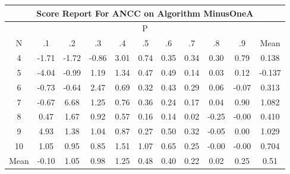 \documentclass[11pt,a4paper]{report}
\begin{document}
\begin{longtable}{ | c || c | c | c | c | c | c | c | c | c || c |}
\hline
\multicolumn{11}{|c|}{ Score Report For ANCC on Algorithm MinusOneA} \\
\hline
\multicolumn{11}{|c|}{ P } \\
\hline
N & .1 & .2 & .3 & .4 & .5 & .6 & .7 & .8 & .9 & Mean\\
 \hline
 \hline
 \endhead
  4 &  \cellcolor[HTML]{FFD7D7} -1.71 &  \cellcolor[HTML]{FFD7D7} -1.72 &  \cellcolor[HTML]{FFE7E7} -0.86 &  \cellcolor[HTML]{B7B7FF} 3.01 &  \cellcolor[HTML]{EFEFFF} 0.74 &  \cellcolor[HTML]{F7F7FF} 0.35 &  \cellcolor[HTML]{F7F7FF} 0.34 &  \cellcolor[HTML]{F7F7FF} 0.30 &  \cellcolor[HTML]{EFEFFF} 0.79 & 0.138 \\
  5 &  \cellcolor[HTML]{FF9797} -4.04 &  \cellcolor[HTML]{FFE7E7} -0.99 &  \cellcolor[HTML]{DFDFFF} 1.19 &  \cellcolor[HTML]{DFDFFF} 1.34 &  \cellcolor[HTML]{F7F7FF} 0.47 &  \cellcolor[HTML]{EFEFFF} 0.49 &  \cellcolor[HTML]{FFFFFF} 0.14 &  \cellcolor[HTML]{FFFFFF} 0.03 &  \cellcolor[HTML]{FFFFFF} 0.12 & -0.137 \\
  6 &  \cellcolor[HTML]{FFEFEF} -0.73 &  \cellcolor[HTML]{FFEFEF} -0.64 &  \cellcolor[HTML]{BFBFFF} 2.47 &  \cellcolor[HTML]{EFEFFF} 0.69 &  \cellcolor[HTML]{F7F7FF} 0.32 &  \cellcolor[HTML]{F7F7FF} 0.43 &  \cellcolor[HTML]{F7F7FF} 0.29 &  \cellcolor[HTML]{FFFFFF} 0.06 &  \cellcolor[HTML]{FFFFFF} -0.07 & 0.313 \\
  7 &  \cellcolor[HTML]{FFEFEF} -0.67 &  \cellcolor[HTML]{5858FF} 6.68 &  \cellcolor[HTML]{DFDFFF} 1.25 &  \cellcolor[HTML]{EFEFFF} 0.76 &  \cellcolor[HTML]{F7F7FF} 0.36 &  \cellcolor[HTML]{F7F7FF} 0.24 &  \cellcolor[HTML]{F7F7FF} 0.17 &  \cellcolor[HTML]{FFFFFF} 0.04 &  \cellcolor[HTML]{E7E7FF} 0.90 & 1.082 \\
  8 &  \cellcolor[HTML]{F7F7FF} 0.47 &  \cellcolor[HTML]{D7D7FF} 1.67 &  \cellcolor[HTML]{E7E7FF} 0.92 &  \cellcolor[HTML]{EFEFFF} 0.57 &  \cellcolor[HTML]{F7F7FF} 0.16 &  \cellcolor[HTML]{FFFFFF} 0.14 &  \cellcolor[HTML]{FFFFFF} 0.02 &  \cellcolor[HTML]{FFF7F7} -0.25 &  \cellcolor[HTML]{FFFFFF} -0.00 & 0.410 \\
  9 &  \cellcolor[HTML]{8080FF} 4.93 &  \cellcolor[HTML]{DFDFFF} 1.38 &  \cellcolor[HTML]{E7E7FF} 1.04 &  \cellcolor[HTML]{E7E7FF} 0.87 &  \cellcolor[HTML]{F7F7FF} 0.27 &  \cellcolor[HTML]{EFEFFF} 0.50 &  \cellcolor[HTML]{F7F7FF} 0.32 &  \cellcolor[HTML]{FFFFFF} -0.05 &  \cellcolor[HTML]{FFFFFF} 0.00 & 1.029 \\
  10 &  \cellcolor[HTML]{E7E7FF} 1.05 &  \cellcolor[HTML]{E7E7FF} 0.95 &  \cellcolor[HTML]{E7E7FF} 0.85 &  \cellcolor[HTML]{D7D7FF} 1.51 &  \cellcolor[HTML]{E7E7FF} 1.07 &  \cellcolor[HTML]{EFEFFF} 0.65 &  \cellcolor[HTML]{F7F7FF} 0.25 &  \cellcolor[HTML]{FFFFFF} -0.00 &  \cellcolor[HTML]{FFFFFF} -0.00 & 0.704 \\
 \hline
 \hline
Mean &  \cellcolor[HTML]{FFFFFF} -0.10 &  \cellcolor[HTML]{E7E7FF} 1.05 &  \cellcolor[HTML]{E7E7FF} 0.98 &  \cellcolor[HTML]{DFDFFF} 1.25 &  \cellcolor[HTML]{EFEFFF} 0.48 &  \cellcolor[HTML]{F7F7FF} 0.40 &  \cellcolor[HTML]{F7F7FF} 0.22 &  \cellcolor[HTML]{FFFFFF} 0.02 &  \cellcolor[HTML]{F7F7FF} 0.25 &  \cellcolor[HTML]{EFEFFF} 0.51
\end{longtable}
\end{document}
